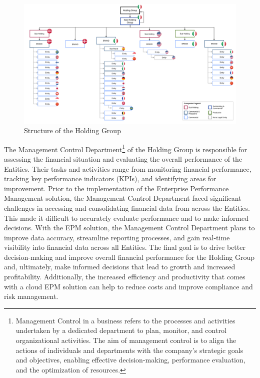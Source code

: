 \documentclass[12pt,a4paper,openright,twoside]{book}
\begin{document}
\begin{figure}[h]
	\centering
	\includegraphics[width=\linewidth]{figures/structure.pdf}
	\caption{Structure of the Holding Group}
	\label{fig:structure}
\end{figure}

The Management Control Department\footnote{Management Control in a business refers to the processes and activities undertaken by a dedicated department to plan, monitor, and control organizational activities. The aim of management control is to align the actions of individuals and departments with the company's strategic goals and objectives, enabling effective decision-making, performance evaluation, and the optimization of resources.} of the Holding Group is responsible for assessing the financial situation and evaluating the overall performance of the Entities.
%
Their tasks and activities range from monitoring financial performance, tracking key performance indicators (KPIs), and identifying areas for improvement.
%
Prior to the implementation of the Enterprise Performance Management solution, the Management Control Department faced significant challenges in accessing and consolidating financial data from across the Entities.
%
This made it difficult to accurately evaluate performance and to make informed decisions.
%
With the EPM solution, the Management Control Department plans to improve data accuracy, streamline reporting processes, and gain real-time visibility into financial data across all Entities. 
%
The final goal is to drive better decision-making and improve overall financial performance for the Holding Group and, ultimately, make informed decisions that lead to growth and increased profitability. 
%
Additionally, the increased efficiency and productivity that comes with a cloud EPM solution can help to reduce costs and improve compliance and risk management.
\end{document}

